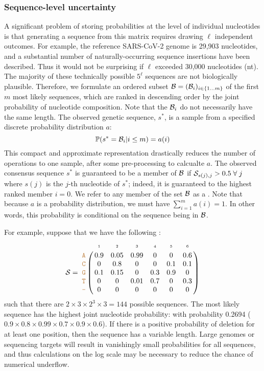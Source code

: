 \documentclass[10pt]{article}
\begin{document}
\subsubsection{Sequence-level uncertainty}

A significant problem of storing probabilities at the level of individual nucleotides is that generating a sequence from this matrix requires drawing $\ell$ independent outcomes.
For example, the reference SARS-CoV-2 genome is 29,903 nucleotides, and a substantial number of naturally-occurring sequence insertions have been described.
Thus it would not be surprising if $\ell$ exceeded 30,000 nucleotides (nt).
The majority of these technically possible $5^\ell$ sequences are not biologically plausible.
Therefore, we formulate an ordered subset $\mathcal{B} = (\mathcal{B}_i)_{i\in\{1\ldots m\} }$ of the first $m$ most likely sequences, which are ranked in descending order by the joint probability of nucleotide composition.
Note that the $\mathcal{B}_i$ do not necessarily have the same length.
The observed genetic sequence, $s^*$, is a sample from a specified discrete probability distribution $a$:
\begin{equation}
\mathbb{P}(s^* = \mathcal{B}_i | i \le m) = a(i)
\end{equation}
This compact and approximate representation drastically reduces the number of operations to one sample, after some pre-processing to calcualte $a$.
The observed consensus sequence $s^*$ is guaranteed to be a member of $\mathcal{B}$ if $\mathcal{S}_{s(j), j} > 0.5\;\forall\;j$ where $s(j)$ is the $j$-th nucleotide of $s^*$; indeed, it is guaranteed to the highest ranked member $i=0$.
We refer to any member of the set $\mathcal{B}$ as a \emph{\slps}.
Note that because $a$ is a probability distribution, we must have $\sum_{i=1}^m a(i) = 1$.
In other words, this probability is conditional on the sequence being in $\mathcal{B}$.


For example, suppose that we have the following \nlps:
$$
\nps = 
\bordermatrix{
& \scriptscriptstyle{1} & \scriptscriptstyle{2}& \scriptscriptstyle{3}& \scriptscriptstyle{4} & \scriptscriptstyle{5} & \scriptscriptstyle{6} \cr
\sq{A} & 0.9 & 0.05   & 0.99 & 0 & 0 & 0.6\cr
\sq{C} & 0   & 0.8 & 0 & 0 & 0.1 & 0.1\cr
\sq{G} & 0.1 & 0.15 & 0 & 0.3 & 0.9 & 0\cr
\sq{T} & 0 & 0 & 0.01 & 0.7 & 0 & 0.3\cr
\sq{-} & 0 & 0 & 0 & 0 & 0 & 0\cr
}
$$
such that there are $2\times 3 \times 2^3 \times 3 = 144$ possible sequences.
The most likely sequence has the highest joint nucleotide probability:  with probability 0.2694 ($0.9\times 0.8\times 0.99 \times 0.7 \times 0.9 \times 0.6$).
If there is a positive probability of deletion for at least one position, then the sequence has a variable length.
Large genomes or sequencing targets will result in vanishingly small probabilities for all sequences, and thus calculations on the log scale may be necessary to reduce the chance of numerical underflow.
\end{document}
